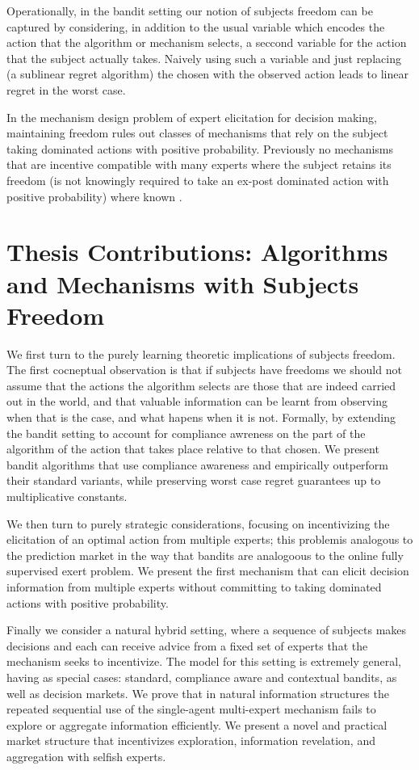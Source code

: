 Operationally, in the bandit setting our notion of subjects freedom can be captured by considering, in addition to the usual variable which encodes the action that the algorithm  or mechanism selects, a seccond variable for the action that the subject actually takes. Naively using such a variable and just replacing (a sublinear regret algorithm) the chosen with the observed action leads to linear regret in the worst case. 

In the mechanism design problem of expert elicitation for decision making, maintaining freedom rules out classes of mechanisms that rely on the subject taking dominated actions with positive probability. Previously no  mechanisms that are incentive compatible with many experts where the subject retains its freedom (is not knowingly required to take an ex-post dominated action with positive probability) where known \cite{othman2010decision,chen2014eliciting}.




\section{Thesis Contributions: Algorithms and Mechanisms with Subjects Freedom}

We first turn to the purely learning theoretic implications of subjects freedom. The first cocneptual observation is that if subjects have freedoms we should not assume that the actions the algorithm selects are those that are indeed carried out in the world, and that valuable information can be learnt from observing when that is the case, and what hapens when it is not.
Formally, by extending the bandit setting to account for compliance awreness on the part of the algorithm of the action that takes place relative to that chosen. We present bandit algorithms that use compliance awareness and empirically  outperform their standard variants, while preserving worst case regret guarantees up to multiplicative constants. 

We then turn to purely strategic considerations, focusing on incentivizing the elicitation of an optimal action from multiple experts; this problemis analogous to the prediction market in the way that bandits are analogoous to the online fully supervised exert problem. 
We present the first mechanism that can elicit decision  information from multiple experts without committing to taking dominated actions with positive probability. 

Finally we consider a natural hybrid setting, where a sequence of subjects makes decisions and each can receive advice from a fixed set of experts that the mechanism seeks to incentivize.
The model for this setting is extremely general, having as special cases: standard, compliance aware and contextual bandits, as well as decision markets.
We prove that in natural information structures the repeated sequential use of the single-agent multi-expert mechanism fails to explore or aggregate information efficiently.
We present a novel and practical market structure that incentivizes exploration, information revelation, and aggregation with selfish experts.



